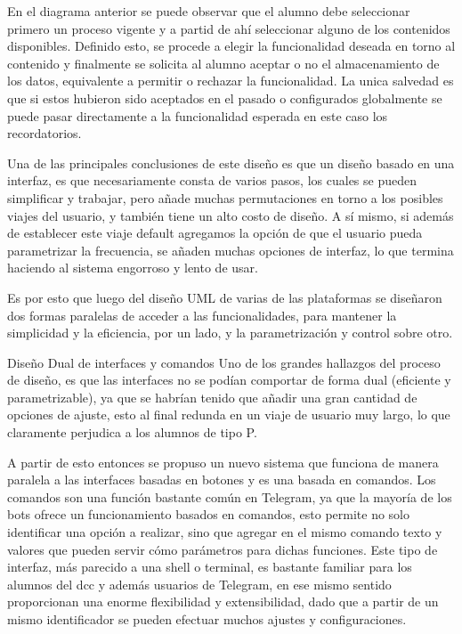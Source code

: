     \par En el diagrama anterior se puede observar que el alumno debe seleccionar primero un proceso vigente y a partid de ahí seleccionar alguno de los contenidos disponibles. Definido esto, se procede a elegir la funcionalidad deseada en torno al contenido y finalmente se solicita al alumno aceptar o no el almacenamiento de los datos, equivalente a permitir o rechazar la funcionalidad. La unica salvedad es que si estos hubieron sido aceptados en el pasado o configurados globalmente se puede pasar directamente a la funcionalidad esperada en este caso los recordatorios.
    \par Una de las principales conclusiones de este diseño es que un diseño basado en una interfaz, es que necesariamente consta de varios pasos, los cuales se pueden simplificar y trabajar, pero añade muchas permutaciones en torno a los posibles viajes del usuario, y también tiene un alto costo de diseño. A sí mismo, si además de establecer este viaje default agregamos la opción de que el usuario pueda parametrizar la frecuencia, se añaden muchas opciones de interfaz, lo que termina haciendo al sistema engorroso y lento de usar.
    \par Es por esto que luego del diseño UML de varias de las plataformas se diseñaron dos formas paralelas de acceder a las funcionalidades, para mantener la simplicidad y la eficiencia, por un lado, y la parametrización y control sobre otro.
    \par Diseño Dual de interfaces y comandos
    Uno de los grandes hallazgos del proceso de diseño, es que las interfaces no se podían comportar de forma dual (eficiente y parametrizable), ya que se habrían tenido que añadir una gran cantidad de opciones de ajuste, esto al final redunda en un viaje de usuario muy largo, lo que claramente perjudica a los alumnos de tipo P.
    \par A partir de esto entonces se propuso un nuevo sistema que funciona de manera paralela a las interfaces basadas en botones y es una basada en comandos.
    Los comandos son una función bastante común en Telegram, ya que la mayoría de los bots ofrece un funcionamiento basados en comandos, esto permite no solo identificar una opción a realizar, sino que agregar en el mismo comando texto y valores que pueden servir cómo parámetros para dichas funciones. Este tipo de interfaz, más parecido a una shell o terminal, es bastante familiar para los alumnos del dcc y además usuarios de Telegram, en ese mismo sentido proporcionan una enorme flexibilidad y extensibilidad, dado que a partir de un mismo identificador se pueden efectuar muchos ajustes y configuraciones.

